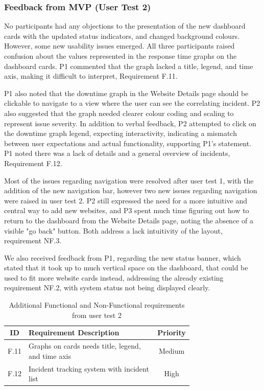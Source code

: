 \subsubsection{Feedback from MVP (User Test 2)}  
No participants had any objections to the presentation of the new dashboard cards with the updated status indicators, and changed background colours. However, some new usability issues emerged. All three participants raised confusion about the values represented in the response time graphs on the dashboard cards. P1 commented that the graph lacked a title, legend, and time axis, making it difficult to interpret, Requirement F.11.

P1 also noted that the downtime graph in the Website Details page should be clickable to navigate to a view where the user can see the correlating incident. P2 also suggested that the graph needed clearer colour coding and scaling to represent issue severity.  In addition to verbal feedback, P2 attempted to click on the downtime graph legend, expecting interactivity, indicating a mismatch between user expectations and actual functionality, supporting P1's statement. P1 noted there was a lack of details and a general overview of incidents, Requirement F.12.


Most of the issues regarding navigation were resolved after user test 1, with the addition of the new navigation bar, however two new issues regarding navigation were raised in user test 2. P2 still expressed the need for a more intuitive and central way to add new websites, and P3 spent much time figuring out how to return to the dashboard from the Website Details page, noting the absence of a visible "go back" button. Both address a lack intuitivity of the layout, requirement NF.3. 

We also received feedback from P1, regarding the new status banner, which stated that it took up to much vertical space on the dashboard, that could be used to fit more website cards instead, addressing the already existing requirement NF.2, with system status not being displayed clearly. 



\begin{table}
    \centering
    \begin{tabular}{|c|p{0.72\linewidth}|c|} \hline
    \textbf{ID} & \textbf{Requirement Description} & \textbf{Priority} \\ \hline
         F.11&  Graphs on cards needs title, legend, and time axis& Medium\\ \hline 
         F.12&  Incident tracking system with incident list& High\\\hline
    \end{tabular}
    \caption{Additional Functional and Non-Functional requirements from user test 2}
    \label{tab:f_req_usertest_2}
\end{table}

